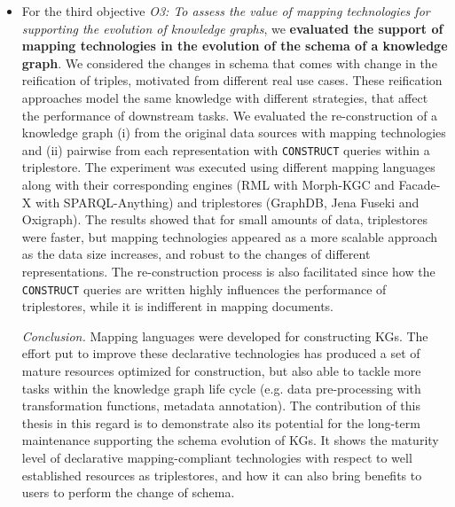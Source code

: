 \begin{itemize}
    \item For the third objective \textit{O3: To assess the value of mapping technologies for supporting the evolution of knowledge graphs}, we \textbf{evaluated the support of mapping technologies in the evolution of the schema of a knowledge graph}. We considered the changes in schema that comes with change in the reification of triples, motivated from different real use cases. These reification approaches model the same knowledge with different strategies, that affect the performance of downstream tasks. We evaluated the re-construction of a knowledge graph (i) from the original data sources with mapping technologies and (ii) pairwise from each representation with \texttt{CONSTRUCT} queries within a triplestore. The experiment was executed using different mapping languages along with their corresponding engines (RML with Morph-KGC and Facade-X with SPARQL-Anything) and triplestores (GraphDB, Jena Fuseki and Oxigraph). The results showed that for small amounts of data, triplestores were faster, but mapping technologies appeared as a more scalable approach as the data size increases, and robust to the changes of different representations. The re-construction process is also facilitated since how the \texttt{CONSTRUCT} queries are written highly influences the performance of triplestores, while it is indifferent in mapping documents. 

    \textit{Conclusion.} Mapping languages were developed for constructing KGs. The effort put  to improve these declarative technologies has produced a set of mature resources optimized for construction, but also able to tackle more tasks within the knowledge graph life cycle (e.g. data pre-processing with transformation functions, metadata annotation). The contribution of this thesis in this regard is to demonstrate also its potential for the long-term maintenance supporting the schema evolution of KGs. It shows the maturity level of declarative mapping-compliant technologies with respect to well established resources as triplestores, and how it can also bring benefits to users to perform the change of schema. 
\end{itemize}




